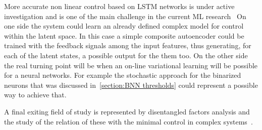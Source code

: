 More accurate non linear control based on LSTM networks is under active investigation and is one of the main challenge in the current ML research~\cite{Lesort_2018, an2019unsupervised}
On one side the system could learn an already defined complex model for control within the latent space. In this case a simple composite autoencoder could be trained with the feedback signals among the input features, thus generating, for each of the latent states, a possible output for the them too.
On the other side the real turning point will be when an on-line variational learning will be possible for a neural networks. 
For example the stochastic approach for the binarized neurons that was discussed in~\cref{section:BNN thresholds} could represent a possible way to achieve that.

A final exiting field of study is represented by disentangled factors analysis and the study of the relation of these with the minimal control in complex systems~\cite{Liu2011}.



